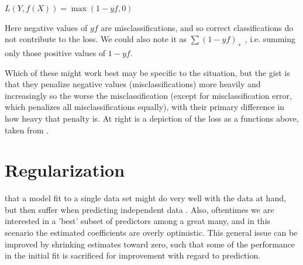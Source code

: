 \documentclass[english,nohyper,titlepage]{tufte-handout}\usepackage{knitr}
\begin{document}
\vspace{.25cm}
\noindent$L(Y, f(X)) = \max(1-yf, 0)$
\vspace{.25cm}

Here negative values of $yf$ are misclassifications, and so correct classifications do not contribute to the loss.  We could also note it as $\sum (1-yf)_+$ , i.e. summing only those positive values of $1-yf$.

\vspace{.25cm}
Which of these might work best may be specific to the situation, but the gist is that they penalize negative values (misclassifications) more heavily and increasingly so the worse the misclassification (except for misclassification error, which penalizes all misclassifications equally), with their primary difference in how heavy that penalty is.  At right is a depiction of the loss as a functions above, taken from \citet{hastie_elements_2009}.











\part{Regularization}
 that a model fit to a single data set might do very well with the data at hand, but then suffer when predicting independent data .  Also, oftentimes we are interested in a 'best' subset of predictors among a great many, and in this scenario the estimated coefficients are overly optimistic.  This general issue can be improved by shrinking estimates toward zero, such that some of the performance in the initial fit is sacrificed for improvement with regard to prediction.
\end{document}
